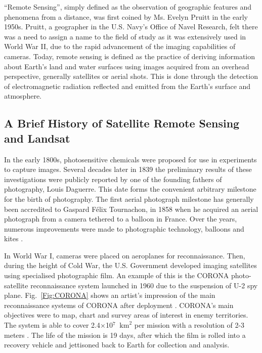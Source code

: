 
``Remote Sensing'', simply defined as the observation of geographic features and phenomena from a distance, was first coined by Ms. Evelyn Pruitt in the early 1950s. Pruitt, a geographer in the U.S. Navy's Office of Navel Research, felt there was a need to assign a name to the field of study as it was extensively used in World War II, due to the rapid advancement of the imaging capabilities of cameras. Today, remote sensing is defined as the practice of deriving information about Earth's land and water surfaces using images acquired from an overhead perspective, generally satellites or aerial shots. This is done through the detection of electromagnetic radiation reflected and emitted from the Earth's surface and atmosphere. \cite{campbell2011introduction} 


\subsection{A Brief History of Satellite Remote Sensing and Landsat}
In the early 1800s, photosensitive chemicals were proposed for use in experiments to capture images. Several decades later in 1839 the preliminary results of these investigations were publicly reported by one of the founding fathers of photography, Louis Daguerre. This date forms the convenient arbitrary milestone for the birth of photography. The first aerial photograph milestone has generally been accredited to Gaspard F\'elix Tournachon, in 1858 when he acquired an aerial photograph from a camera tethered to a balloon in France. Over the years, numerous improvements were made to photographic technology, balloons and kites \cite{campbell2011introduction}. 
\par
In World War I, cameras were placed on aeroplanes for reconnaissance. Then, during the height of Cold War, the U.S. Government developed imaging satellites using specialised photographic film. An example of this is the CORONA photo-satellite reconnaissance system launched in 1960 due to the suspension of U-2 spy plane. Fig.~\ref{Fig:CORONA} shows an artist's impression of the main reconnaissance systems of CORONA after deployment \cite{CORONA}. CORONA's main objectives were to map, chart and survey areas of interest in enemy territories. The system is able to cover 2.4$\times$10$^{7}$ $\mathrm{~km}^{2}$ per mission with a resolution of 2-3 meters \cite{CORONA}. The life of the mission is 19 days, after which the film is rolled into a recovery vehicle and jettisoned back to Earth for collection and analysis.


